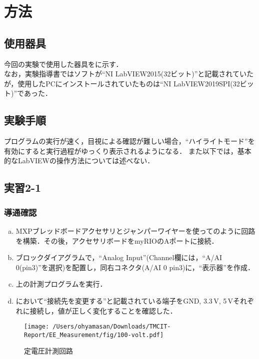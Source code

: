 \newpage
\section{方法}
\subsection{使用器具}
今回の実験で使用した器具をに示す．\\
なお，実験指導書ではソフトが``NI LabVIEW2015(32ビット)''と記載されていたが，使用したPCにインストールされていたものは``NI LabVIEW2019SPI(32ビット)''であった．

\begin{table}[hbtp]
  \centering
  \caption{実験装置}
  \label{tab:kigu}
\end{table}

\subsection{実験手順}
プログラムの実行が速く，目視による確認が難しい場合，``ハイライトモード''を有効にすると実行過程がゆっくり表示されるようになる．
また以下では，基本的なLabVIEWの操作方法については述べない．
\subsection{実習2-1}
\subsubsection{導通確認}
\begin{enumerate}[a)]
	\item MXPブレッドボードアクセサリとジャンパーワイヤーを使ってのように回路を構築．その後，アクセサリボードをmyRIOのAポートに接続．
	\item ブロックダイアグラムで，``Analog Input''(Channel欄には，``A/AI 0(pin3)''を選択)を配置し，同右コネクタ(A/AI 0 pin3)に，``表示器''を作成．
	\item 上の計測プログラムを実行．
	\item {}において``接続先を変更する''と記載されている端子をGND, 3.3\,\rm{V}, 5\,\rm{V}それぞれに接続し，値が正しく変化することを確認した．
\end{enumerate}
\begin{figure}
\centering
\texttt{[image: /Users/ohyamasan/Downloads/TMCIT-Report/EE\_Measurement/fig/100-volt.pdf]}
\caption{定電圧計測回路}
\label{fig:2.12}
\end{figure}

